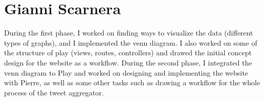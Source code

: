 \section{Gianni Scarnera}

During the first phase, I worked on finding ways to visualize the data (different types of graphs), and I implemented the venn diagram. I also worked on some of the structure of play (views, routes, controllers) and drawed the initial concept design for the website as a workflow. During the second phase, I integrated the venn diagram to Play and worked on designing and implementing the website with Pierre, as well as some other tasks such as drawing a workflow for the whole process of the tweet aggregator.






